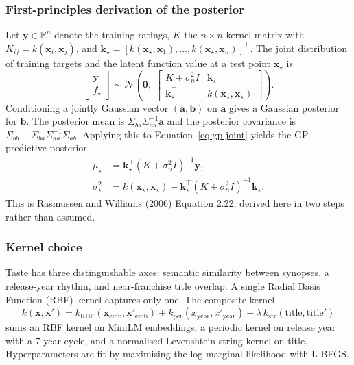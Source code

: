 \documentclass{article}
\begin{document}
\subsubsection*{First-principles derivation of the posterior}

Let $\mathbf{y} \in \mathbb{R}^n$ denote the training ratings, $K$ the $n \times n$ kernel matrix with $K_{ij} = k(\mathbf{x}_i, \mathbf{x}_j)$, and $\mathbf{k}_\star = [k(\mathbf{x}_\star, \mathbf{x}_1), \ldots, k(\mathbf{x}_\star, \mathbf{x}_n)]^\top$. The joint distribution of training targets and the latent function value at a test point $\mathbf{x}_\star$ is
\begin{equation}
\begin{bmatrix} \mathbf{y} \\ f_\star \end{bmatrix} \sim \mathcal{N}\!\left(\mathbf{0},\; \begin{bmatrix} K + \sigma_n^2 I & \mathbf{k}_\star \\ \mathbf{k}_\star^\top & k(\mathbf{x}_\star, \mathbf{x}_\star) \end{bmatrix}\right).
\label{eq:gp-joint}
\end{equation}
Conditioning a jointly Gaussian vector $(\mathbf{a}, \mathbf{b})$ on $\mathbf{a}$ gives a Gaussian posterior for $\mathbf{b}$. The posterior mean is $\Sigma_{ba} \Sigma_{aa}^{-1} \mathbf{a}$ and the posterior covariance is $\Sigma_{bb} - \Sigma_{ba} \Sigma_{aa}^{-1} \Sigma_{ab}$. Applying this to Equation~\ref{eq:gp-joint} yields the GP predictive posterior
\begin{equation}
\begin{aligned}
\mu_\star &= \mathbf{k}_\star^\top (K + \sigma_n^2 I)^{-1} \mathbf{y}, \\
\sigma_\star^2 &= k(\mathbf{x}_\star, \mathbf{x}_\star) - \mathbf{k}_\star^\top (K + \sigma_n^2 I)^{-1} \mathbf{k}_\star.
\end{aligned}
\label{eq:gp-posterior}
\end{equation}
This is Rasmussen and Williams (2006) Equation 2.22, derived here in two steps rather than assumed.

\subsubsection*{Kernel choice}

Taste has three distinguishable axes: semantic similarity between synopses, a release-year rhythm, and near-franchise title overlap. A single Radial Basis Function (RBF) kernel captures only one. The composite kernel
\begin{equation}
k(\mathbf{x}, \mathbf{x}') = k_\mathrm{RBF}(\mathbf{x}_\mathrm{emb}, \mathbf{x}'_\mathrm{emb}) + k_\mathrm{per}(x_\mathrm{year}, x'_\mathrm{year}) + \lambda \, k_\mathrm{str}(\text{title}, \text{title}')
\label{eq:gp-kernel}
\end{equation}
sums an RBF kernel on MiniLM embeddings, a periodic kernel on release year with a 7-year cycle, and a normalised Levenshtein string kernel on title. Hyperparameters are fit by maximising the log marginal likelihood with L-BFGS.
\end{document}
